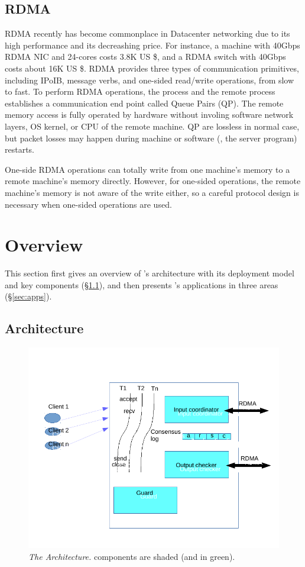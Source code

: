 \subsection{RDMA}\label{sec:rdma}
RDMA recently has become commonplace in Datacenter networking due to its high 
performance and its decreashing price. For instance, a machine with 40Gbps RDMA 
NIC and 24-cores costs 3.8K US \$, and a RDMA switch with 40Gbps costs about 
16K US \$. RDMA provides three types of communication primitives, including 
IPoIB, message verbs, and one-sided read/write operations, from slow to fast. To 
perform RDMA operations, the process and the remote process establishes a 
communication end point called Queue Pairs (QP). The remote memory access is 
fully operated by hardware without involing software network layers, OS kernel, 
or CPU of the remote machine. QP are lossless in normal case, but packet losses 
may happen during machine or software (\eg, the server program) restarts.

One-side RDMA operations can totally write from one machine's memory to a 
remote machine's memory directly. However, for one-sided operations, the remote 
machine's memory is not aware of the write either, so a careful protocol design 
is necessary when one-sided operations are used.


\section{\xxx Overview}\label{sec:overview}

This section first gives an overview of \xxx's architecture with its 
deployment model and key components (\S\ref{sec:arch}), and then presents 
\xxx's applications in three areas (\S\ref{sec:apps}).
 
\subsection{Architecture}\label{sec:arch}

\begin{figure}[t]
\centering
\includegraphics[width=.5\textwidth]{figures/arch}
\vspace{-.20in}
\caption{{\em The \xxx Architecture.} \xxx components are shaded (and in
  green).} \label{fig:arch}
\vspace{-.05in}
\end{figure}

